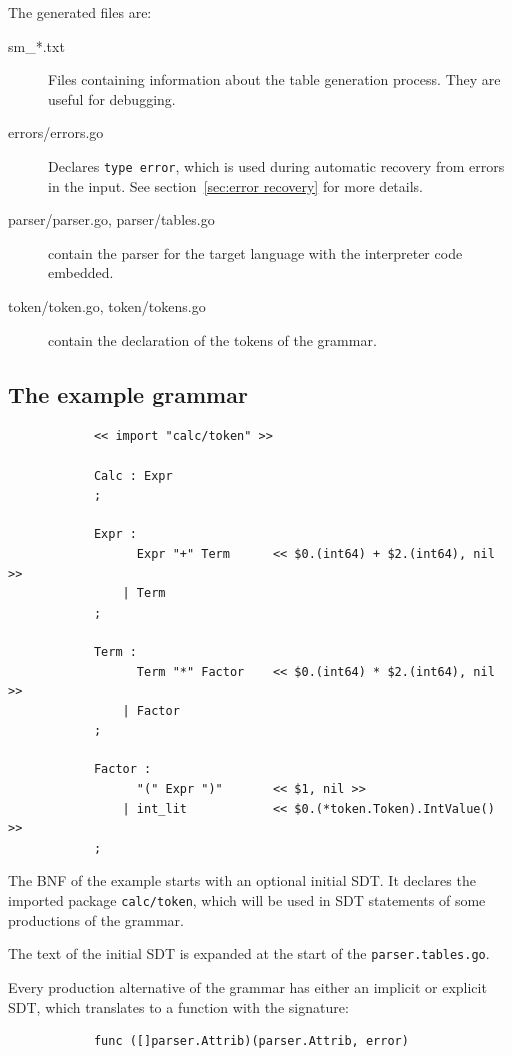 \documentclass[12pt]{article}
\begin{document}
		The generated files are:
		\begin{description}
			\item[sm\_*.txt] Files containing information about the table generation process. They are useful for debugging.

			\item[errors/errors.go] Declares \verb|type error|, which is used during automatic recovery from errors in the input. See section~\ref{sec:error recovery} for more details.

			\item[parser/parser.go, parser/tables.go] contain the parser for the target language with the interpreter code embedded.

			\item[token/token.go, token/tokens.go] contain the declaration of the tokens of the grammar.
		\end{description}

	\subsection{The example grammar}
		\begin{verbatim}
			<< import "calc/token" >>

			Calc : Expr              
			;

			Expr :
			      Expr "+" Term      << $0.(int64) + $2.(int64), nil >>
			    | Term			
			;

			Term :
			      Term "*" Factor    << $0.(int64) * $2.(int64), nil >>
			    | Factor			
			;

			Factor :
			      "(" Expr ")"       << $1, nil >>
			    | int_lit            << $0.(*token.Token).IntValue() >>
			;
		\end{verbatim}

		The BNF of the example starts with an optional initial SDT. It declares the imported package \verb|calc/token|, which will be used in SDT statements of some productions of the grammar. 

		The text of the initial SDT is expanded at the start of the \verb|parser.tables.go|.

		Every production alternative of the grammar has either an implicit or explicit SDT, which translates to a function with the signature:

		\begin{verbatim}
			func ([]parser.Attrib)(parser.Attrib, error)
		\end{verbatim}
\end{document}
